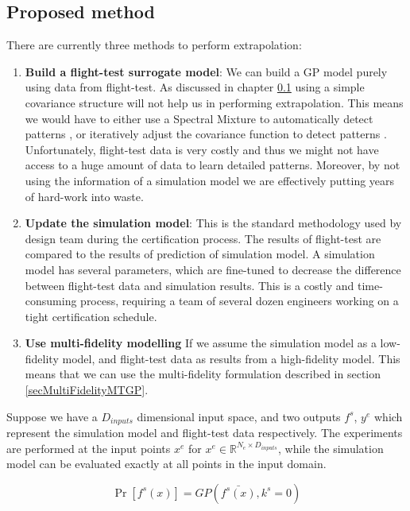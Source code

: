 \subsection{Proposed method}
There are currently three methods to perform extrapolation:
\begin{enumerate}
\item \textbf{Build a flight-test surrogate model}: We can build a GP model purely using data from flight-test. As discussed in chapter \ref{} using a simple covariance structure will not help us in performing extrapolation. This means we would have to either use a Spectral Mixture to automatically detect patterns \cite{wilson2014thesis}, or iteratively adjust the covariance function to detect patterns \cite{duvenaud-thesis-2014}. Unfortunately, flight-test data is very costly and thus we might not have access to a huge amount of data to learn detailed patterns. Moreover, by not using the information of a simulation model we are effectively putting years of hard-work into waste. 

\item \textbf{Update the simulation model}: This is the standard methodology used by design team during the certification process. The results of flight-test are compared to the results of prediction of simulation model. A simulation model has several parameters, which are fine-tuned to decrease the difference between flight-test data and simulation results. This is a costly and time-consuming process, requiring a team of several dozen engineers working on a tight certification schedule. 

\item \textbf{Use multi-fidelity modelling} If we assume the simulation model as a low-fidelity model, and flight-test data as results from a high-fidelity model. This means that we can use the multi-fidelity formulation described in section \ref{secMultiFidelityMTGP}.
\end{enumerate}

Suppose we have a \(D_{inputs}\) dimensional input space, and two outputs $f^{s}$, $y^{e}$ which represent the simulation model and flight-test data respectively. The experiments are performed at the input points $x^{e}$ for $x^e \in \mathbb{R}^{N_{e} \times D_{inputs}}$, while the simulation model can be evaluated exactly at all points in the input domain.

\begin{equation}
    \Pr[f^{s}(x)] = GP(\bar{f^{s}(x)}, k^{s} = 0)
\end{equation}


